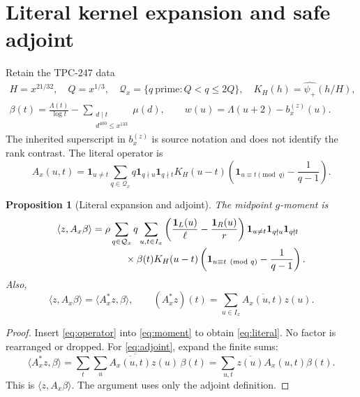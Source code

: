 \documentclass[10pt]{article}
\newtheorem{proposition}[theorem]{Proposition}
\newcommand{\ip}[2]{\langle #1,#2\rangle}
\newcommand{\conj}[1]{\overline{#1}}
\newcommand{\one}{\mathbf 1}
\begin{document}
\section{Literal kernel expansion and safe adjoint}

Retain the TPC-247 data
\begin{gather}
 H=x^{21/32},\quad Q=x^{1/3},\quad
 \mathcal Q_x=\{q\ \text{prime}:Q<q\leq2Q\},\quad
 K_H(h)=\widehat{\psi_+}(h/H),                                       \label{eq:scales}\\
 \beta(t)=\frac{\Lambda(t)}{\log t}
 -\sum_{\substack{d\mid t\\d^{400}\leq x^{133}}}\mu(d),\qquad
 w(u)=\Lambda(u+2)-b_x^{(z)}(u).                                    \label{eq:weights}
\end{gather}
The inherited superscript in $b_x^{(z)}$ is source notation and does not
identify the rank contrast.  The literal operator is
\begin{equation}
 A_x(u,t)=\one_{u\ne t}\sum_{q\in\mathcal Q_x}q
 \one_{q\nmid u}\one_{q\nmid t}K_H(u-t)
 \left(\one_{u\equiv t\pmod q}-\frac1{q-1}\right).                 \label{eq:operator}
\end{equation}

\begin{proposition}[Literal expansion and adjoint]\label{prop:literal}
The midpoint $g$-moment is
\begin{align}
 \ip z{A_x\beta}
 ={}&\rho\sum_{q\in\mathcal Q_x}q\sum_{u,t\in I_x}
 \left(\frac{\one_L(u)}\ell-\frac{\one_R(u)}r\right)
 \one_{u\ne t}\one_{q\nmid u}\one_{q\nmid t}                    \notag\\[-2pt]
 &\qquad\times\beta(t)K_H(u-t)
 \left(\one_{u\equiv t\pmod q}-\frac1{q-1}\right).               \label{eq:literal}
\end{align}
Also,
\begin{equation}
 \ip z{A_x\beta}=\ip{A_x^*z}\beta,\qquad
 (A_x^*z)(t)=\sum_{u\in I_x}\conj{A_x(u,t)}z(u).                    \label{eq:adjoint}
\end{equation}
\end{proposition}

\begin{proof}
Insert \eqref{eq:operator} into \eqref{eq:moment} to obtain
\eqref{eq:literal}.  No factor is rearranged or dropped.  For
\eqref{eq:adjoint}, expand the finite sums:
\[
 \ip{A_x^*z}\beta
 =\sum_t\conj{\sum_u\conj{A_x(u,t)}z(u)}\,\beta(t)
 =\sum_{u,t}\conj{z(u)}A_x(u,t)\beta(t).
\]
This is $\ip z{A_x\beta}$.  The argument uses only the adjoint definition.
\end{proof}
\end{document}
